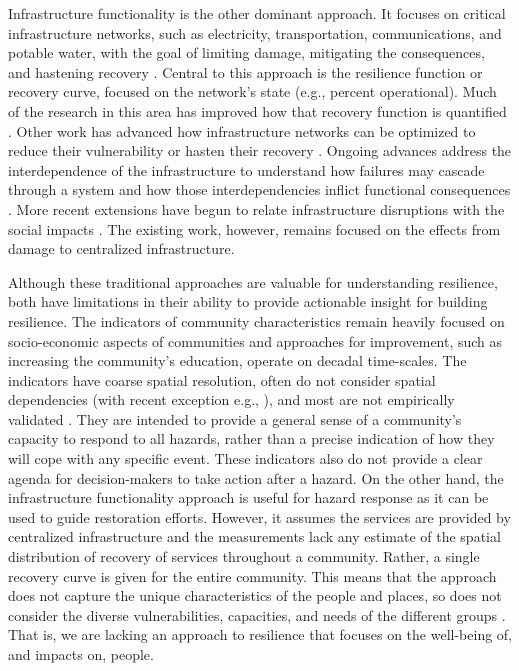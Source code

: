 \documentclass[onecolumn,doublespacing]{risa}
\let \citeA \textcite
\let \cite \parencite
\begin{document}
Infrastructure functionality is the other dominant approach.
It focuses on critical infrastructure networks, such as electricity, transportation, communications, and potable water, with the goal of limiting damage, mitigating the consequences, and hastening recovery \cite{Bruneau2003-px, Barker2013-od, Hosseini2016-pm, Haimes2009-gj, Guidotti2016-vu, Curt2018-kl}.
Central to this approach is the resilience function or recovery curve, focused on the network's state (e.g., percent operational).
Much of the research in this area has improved how that recovery function is quantified \cite{Bruneau2003-px, Chang2004-et, Cimellaro2010-ov, Vugrin2010-vy, Ayyub2014-mf, Sharma2018-rs}.
Other work has advanced how infrastructure networks can be optimized to reduce their vulnerability or hasten their recovery \cite{Hosseini2016-pm, Xu2007-sc}.
Ongoing advances address the interdependence of the infrastructure to understand how failures may cascade through a system \cite{Guidotti2016-vu, Gardoni2018-xu, Stodle_undated-rg, Filippini2014-et} and how those interdependencies inflict functional consequences \cite{Franchin2015-mo}.
More recent extensions have begun to relate infrastructure disruptions with the social impacts \cite{Gardoni2018-xu, Clark2018-pr, Guidotti2019-fc, Franchin2015-mo, Gomez2019-ry}. 
The existing work, however, remains focused on the effects from damage to centralized infrastructure.

Although these traditional approaches are valuable for understanding resilience, both have limitations in their ability to provide actionable insight for building resilience.
The indicators of community characteristics remain heavily focused on socio-economic aspects of communities \cite{Koliou2018-jt} and approaches for improvement, such as increasing the community's education, operate on decadal time-scales.
The indicators have coarse spatial resolution, often do not consider spatial dependencies (with recent exception e.g., \citeA{Frazier2013-ct}), and most are not empirically validated \cite{Bakkensen2016-ht, GillespieMarthaler2019-ak}.
They are intended to provide a general sense of a community's capacity to respond to all hazards, rather than a precise indication of how they will cope with any specific event. 
These indicators also do not provide a clear agenda for decision-makers to take action after a hazard.
On the other hand, the infrastructure functionality approach is useful for hazard response as it can be used to guide restoration efforts.
However, it assumes the services are provided by centralized infrastructure and the measurements lack any estimate of the spatial distribution of recovery of services throughout a community. 
Rather, a single recovery curve is given for the entire community.
This means that the approach does not capture the unique characteristics of the people and places, so does not consider the diverse vulnerabilities, capacities, and needs of the different groups \cite{Cutter2008-placeBasedModel, Cutter2010-vg, Doorn2018-fx}. 
That is, we are lacking an approach to resilience that focuses on the well-being of, and impacts on, people.
\end{document}
